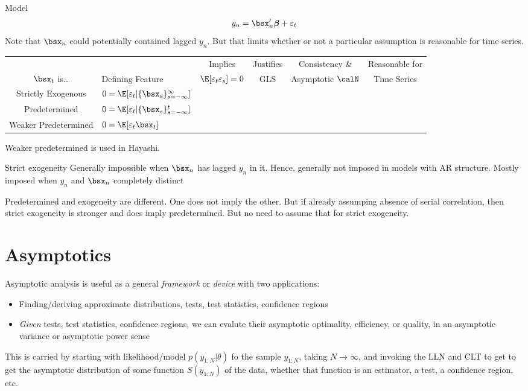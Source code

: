\documentclass[12pt]{article}
\theoremstyle{plain}
\theoremstyle{definition}
\theoremstyle{remark}
\newcommand{\ra}{\rightarrow}
\newcommand{\bsbeta}{\boldsymbol{\beta}}
\newcommand{\cmark}{\text{\ding{51}}}
\newcommand{\xmark}{\text{\ding{55}}}
\begin{document}
Model
\begin{align*}
  y_n
  = \bsx_n'\bsbeta + \varepsilon_t
\end{align*}
Note that $\bsx_n$ could potentially contained lagged $y_n$. But that
limits whether or not a particular assumption is reasonable for time
series.
\begin{table}[htbp!]
\centering
\begin{tabular}{c|lcccc}
    &
    & Implies
    & Justifies
    & Consistency \&
    & Reasonable for
  \\
  $\bsx_t$ is\dots
    & Defining Feature
    & $\E[\varepsilon_t\varepsilon_{s}]=0$
    & GLS
    & Asymptotic $\calN$
    & Time Series
  \\\hline\hline
  Strictly Exogenous
    & $0=\E[\varepsilon_t|\{\bsx_s\}_{s=-\infty}^\infty]$
    & \xmark
    & \cmark
    & \cmark
    & \xmark
  \\
  Predetermined
    & $0=\E[\varepsilon_t|\{\bsx_s\}_{s=-\infty}^t]$
    & \cmark
    & \xmark
    & \cmark
    & \cmark
  \\
  Weaker Predetermined
    & $0=\E[\varepsilon_t\bsx_t]$
    & \xmark
    & \xmark
    & \cmark
    & \cmark
\end{tabular}
\end{table}

Weaker predetermined is used in Hayashi.

Strict exogeneity Generally impossible when $\bsx_n$ has lagged $y_n$ in
it.  Hence, generally not imposed in models with AR structure.
Mostly imposed when $y_n$ and $\bsx_n$ completely distinct

Predetermined and exogeneity are different. One does not imply the
other.
But if already assumping absence of serial correlation, then strict
exogeneity is stronger and does imply predetermined.
But no need to assume that for strict exogeneity.





\clearpage
\section{Asymptotics}

Asymptotic analysis is useful as a general \emph{framework} or
\emph{device} with two applications:
\begin{itemize}
  \item Finding/deriving approximate distributions, tests,
    test statistics, confidence regions
  \item \emph{Given} tests, test statistics, confidence regions,
    we can evalute their asymptotic optimality, efficiency, or quality,
    in an asymptotic variance or asymptotic power sense
\end{itemize}
This is carried by starting with likelihood/model $p(y_{1:N}|\theta)$ fo
the sample $y_{1:N}$, taking $N\ra\infty$, and invoking the LLN and CLT
to get to get the asymptotic distribution of some function $S(y_{1:N})$
of the data, whether that function is an estimator, a test, a confidence
region, etc.
\end{document}
